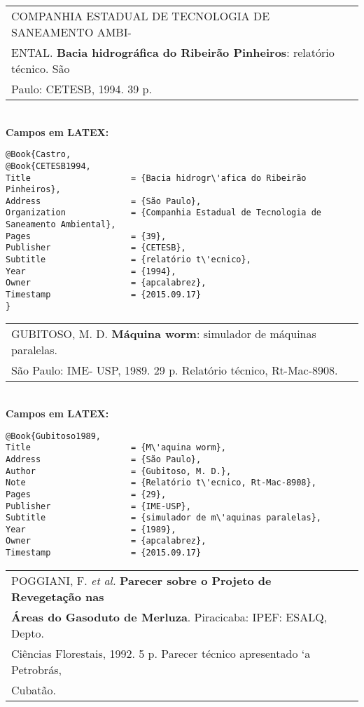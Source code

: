 \begin{tabular}{|l|c|} \hline
	COMPANHIA ESTADUAL DE TECNOLOGIA DE SANEAMENTO AMBI-\\ENTAL. \textbf{Bacia hidrogr\'afica do Ribeirão Pinheiros}: relatório t\'ecnico. São \\Paulo: CETESB, 1994. 39 p.   \\\hline
\end{tabular}\\

\textbf{Campos em LATEX:}

\begin{verbatim}
@Book{Castro,
@Book{CETESB1994,
Title                    = {Bacia hidrogr\'afica do Ribeirão Pinheiros},
Address                  = {São Paulo},
Organization             = {Companhia Estadual de Tecnologia de 
Saneamento Ambiental},
Pages                    = {39},
Publisher                = {CETESB},
Subtitle                 = {relatório t\'ecnico},
Year                     = {1994},
Owner                    = {apcalabrez},
Timestamp                = {2015.09.17}
}
\end{verbatim}

\begin{tabular}{|l|c|} \hline
	GUBITOSO, M. D. \textbf{M\'aquina worm}: simulador de m\'aquinas paralelas. \\São Paulo: IME- USP, 1989. 29 p. Relatório t\'ecnico, Rt-Mac-8908.   \\\hline
\end{tabular}\\

\textbf{Campos em LATEX:}

\begin{verbatim}
@Book{Gubitoso1989,
Title                    = {M\'aquina worm},
Address                  = {São Paulo},
Author                   = {Gubitoso, M. D.},
Note                     = {Relatório t\'ecnico, Rt-Mac-8908},
Pages                    = {29},
Publisher                = {IME-USP},
Subtitle                 = {simulador de m\'aquinas paralelas},
Year                     = {1989},
Owner                    = {apcalabrez},
Timestamp                = {2015.09.17}
\end{verbatim}


\begin{tabular}{|l|c|} \hline
	POGGIANI, F. \textit{et al.} \textbf{ Parecer sobre o Projeto de Revegetação nas} \\ \textbf{Áreas do
		Gasoduto de Merluza}. Piracicaba: IPEF: ESALQ, Depto. \\ Ci\^encias Florestais,
	1992. 5 p. Parecer t\'ecnico apresentado `a Petrobr\'as,\\Cubatão.   \\\hline
\end{tabular}\\




